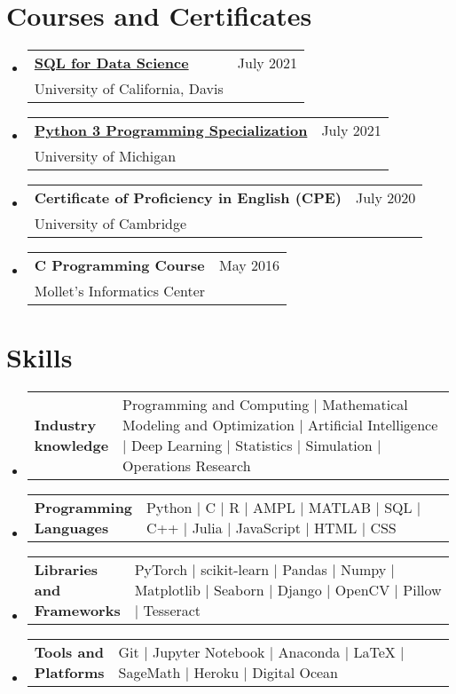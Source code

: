 \documentclass[a4paper,10pt]{article}
\makeatletter
\newcommand{\resumeSectionTypeOne}[2]{
  \item\begin{tabular*}{0.99\textwidth}[t]{
    p{0.18\linewidth}p{0.81\linewidth}
  }
  \textbf{#1} & #2
  \end{tabular*}\vspace{-2pt}
}
\newcommand{\resumeQuadHeading}[4]{
  \item
  \begin{tabular*}{0.96\textwidth}[t]{l@{\extracolsep{\fill}}r}
    \textbf{#1} & \small #2 \\
    \small#3 & \small #4 \\
  \end{tabular*}
}
\newcommand{\resumeHeadingListStart}{
  \begin{itemize}[leftmargin=0.15in, label={}]
}
\newcommand{\resumeHeadingListEnd}{\end{itemize}}
\makeatother
\begin{document}


\section{Courses and Certificates}
  \resumeHeadingListStart{}
    \resumeQuadHeading{\href{https://www.coursera.org/account/accomplishments/verify/ZNTSZQQ9TLQK}{SQL for Data Science}}{July 2021}{University of California, Davis}{\ }
  \resumeHeadingListEnd{}

  \resumeHeadingListStart{}
    \resumeQuadHeading{\href{https://www.coursera.org/account/accomplishments/specialization/WMG73QR4GJLH}{Python 3 Programming Specialization}}{July 2021}{University of Michigan}{\ }
  \resumeHeadingListEnd{}

  \resumeHeadingListStart{}
    \resumeQuadHeading{Certificate of Proficiency in English (CPE)}{July 2020}{University of Cambridge}{\ }
  \resumeHeadingListEnd{}

  \resumeHeadingListStart{}
    \resumeQuadHeading{C Programming Course}{May 2016}{Mollet's Informatics Center}{\ }
  \resumeHeadingListEnd{}


\section{Skills}
  \resumeHeadingListStart{}
    \resumeSectionTypeOne{Industry knowledge}{Programming and Computing \; $|$ \; Mathematical Modeling and Optimization \; $|$ \; Artificial Intelligence \; $|$ \; Deep Learning \; $|$ \; Statistics \; $|$ \; Simulation \; $|$ \; Operations Research}
  \resumeHeadingListEnd{}

  \resumeHeadingListStart{}
    \resumeSectionTypeOne{Programming Languages}{Python \; $|$ \; C \; $|$ \; R \; $|$ \; AMPL \; $|$ \; MATLAB \; $|$ \; SQL \; $|$ \; C++ \; $|$ Julia \; $|$ JavaScript \; $|$ \; HTML \; $|$ \; CSS}
  \resumeHeadingListEnd{}

  \resumeHeadingListStart{}
    \resumeSectionTypeOne{Libraries and Frameworks}{PyTorch \; $|$ \; scikit-learn \; $|$ \; Pandas \; $|$ \; Numpy \; $|$ \; Matplotlib \; $|$ \; Seaborn \; $|$ \; Django \; $|$ \; OpenCV \; $|$ \; Pillow \; $|$ \; Tesseract}
  \resumeHeadingListEnd{}
  
  \resumeHeadingListStart{}
    \resumeSectionTypeOne{Tools and Platforms}{Git \; $|$ \; Jupyter Notebook \; $|$ \; Anaconda \; $|$ \; \LaTeX \; $|$ \; SageMath \; $|$ \; Heroku \; $|$ \; Digital Ocean}
  \resumeHeadingListEnd{}
\end{document}
